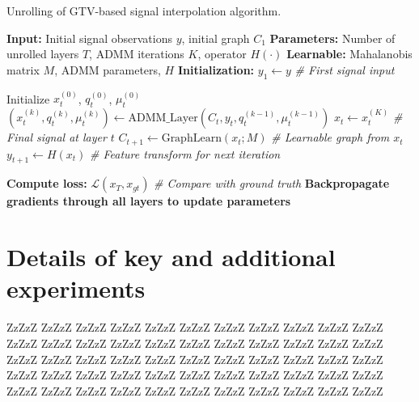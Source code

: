 \documentclass{article}
\theoremstyle{plain}
\theoremstyle{definition}
\theoremstyle{remark}
\begin{document}
\begin{algorithm}[h]
   \caption{Unrolling of GTV-based signal interpolation algorithm.}
   \label{alg:ugtv_admm_bp}
\begin{algorithmic}
   \STATE \textbf{Input:} Initial signal observations $y$, initial graph $C_1$
   \STATE \textbf{Parameters:} Number of unrolled layers $T$, ADMM iterations $K$, operator $H(\cdot)$
   \STATE \textbf{Learnable:} Mahalanobis matrix $M$, ADMM parameters, $H$
   \STATE \textbf{Initialization:} $y_1 \gets y$ \hfill \textit{\# First signal input}

       \STATE Initialize $x_t^{(0)}$, $q_t^{(0)}$, $\mu_t^{(0)}$
            \STATE $(x_t^{(k)}, q_t^{(k)}, \mu_t^{(k)}) \gets \text{ADMM\_Layer}(C_t, y_t, q_t^{(k-1)}, \mu_t^{(k-1)})$
       \ENDFOR
       \STATE $x_t \gets x_t^{(K)}$ \hfill \textit{\# Final signal at layer $t$}
           \STATE $C_{t+1} \gets \text{GraphLearn}(x_t; M)$ \hfill \textit{\# Learnable graph from $x_t$}
           \STATE $y_{t+1} \gets H(x_t)$ \hfill \textit{\# Feature transform for next iteration}
       \ENDIF
   \ENDFOR

   \STATE \textbf{Compute loss:} $\mathcal{L}(x_T, x_{gt})$ \hfill \textit{\# Compare with ground truth}
   \STATE \textbf{Backpropagate gradients through all layers to update parameters}
\end{algorithmic}
\end{algorithm}


\section{Details of key and additional experiments}

ZzZzZ ZzZzZ ZzZzZ ZzZzZ ZzZzZ ZzZzZ ZzZzZ ZzZzZ ZzZzZ ZzZzZ ZzZzZ ZzZzZ ZzZzZ ZzZzZ ZzZzZ ZzZzZ ZzZzZ ZzZzZ ZzZzZ ZzZzZ ZzZzZ ZzZzZ ZzZzZ ZzZzZ ZzZzZ ZzZzZ ZzZzZ ZzZzZ ZzZzZ ZzZzZ ZzZzZ ZzZzZ ZzZzZ ZzZzZ ZzZzZ ZzZzZ ZzZzZ ZzZzZ ZzZzZ ZzZzZ ZzZzZ ZzZzZ ZzZzZ ZzZzZ ZzZzZ ZzZzZ ZzZzZ ZzZzZ ZzZzZ ZzZzZ ZzZzZ ZzZzZ ZzZzZ ZzZzZ ZzZzZ



\end{document}
